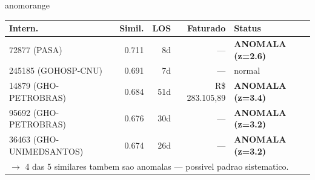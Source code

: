 \documentclass[a4paper,10pt]{article}
\begin{document}
\begin{anomalycard}[Internacao 3677 | GHO-AMIL | ALTO (z=3.46)]{anomorange}
\begin{tabular}{l r r r l}\toprule\textbf{Intern.} & \textbf{Simil.} & \textbf{LOS} & \textbf{Faturado} & \textbf{Status} \\\midrule
72877 (PASA) & 0.711 & 8d & --- & \textcolor{anomred}{\textbf{ANOMALA (z=2.6)}} \\
245185 (GOHOSP-CNU) & 0.691 & 7d & --- & \textcolor{jcubeblue}{normal} \\
14879 (GHO-PETROBRAS) & 0.684 & 51d & R\$ 283.105,89 & \textcolor{anomred}{\textbf{ANOMALA (z=3.4)}} \\
95692 (GHO-PETROBRAS) & 0.676 & 30d & --- & \textcolor{anomred}{\textbf{ANOMALA (z=3.2)}} \\
36463 (GHO-UNIMEDSANTOS) & 0.674 & 26d & --- & \textcolor{anomred}{\textbf{ANOMALA (z=3.2)}} \\
\multicolumn{5}{l}{\textcolor{anomred}{\small $\rightarrow$ 4 das 5 similares tambem sao anomalas --- possivel padrao sistematico.}} \\
\bottomrule\end{tabular}


\end{anomalycard}

\newpage
\end{document}

